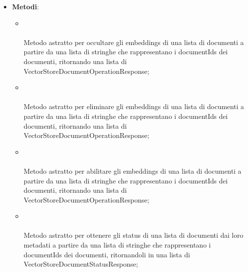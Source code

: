 \documentclass[10pt, a4paper]{article}
\begin{document}
\label{VectorStoreManagerDettaglio}
\begin{itemize}
    \item \textbf{Metodi}:
    \begin{itemize}
        \item {}\\ \\
        Metodo astratto per occultare gli embeddings di una lista di documenti a partire da una lista di stringhe che rappresentano i documentIds dei documenti, ritornando una lista di VectorStoreDocumentOperationResponse;

        \item {}\\ \\
        Metodo astratto per eliminare gli embeddings di una lista di documenti a partire da una lista di stringhe che rappresentano i documentIds dei documenti, ritornando una lista di VectorStoreDocumentOperationResponse;

        \item {}\\ \\
        Metodo astratto per abilitare gli embeddings di una lista di documenti a partire da una lista di stringhe che rappresentano i documentIds dei documenti, ritornando una lista di VectorStoreDocumentOperationResponse;

        \item {}\\ \\
        Metodo astratto per ottenere gli status di una lista di documenti dai loro metadati a partire da una lista di stringhe che rappresentano i documentIds dei documenti, ritornandoli in una lista di VectorStoreDocumentStatusResponse;


\end{itemize}
\end{itemize}
\end{document}
